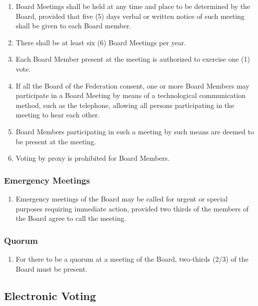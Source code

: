 \begin{enumerate}
 \item
  Board Meetings shall be held at any time and place to be determined by the Board, provided that five (5) days verbal or written notice of such meeting shall be given to each Board member.
 \item
  There shall be at least six (6) Board Meetings per year.
 \item
  Each Board Member present at the meeting is authorized to exercise one (1) vote.
 \item
  If all the Board of the Federation consent, one or more Board Members may participate in a Board Meeting by means of a technological communication method, such as the telephone, allowing all persons participating in the meeting to hear each other.
 \item
  Board Members participating in such a meeting by such means are deemed to be present at the meeting.
 \item
  Voting by proxy is prohibited for Board Members.
\end{enumerate}

\subsubsection{Emergency Meetings}
\label{emergency-meetings}

\begin{enumerate}
 \item
  Emergency meetings of the Board may be called for urgent or special purposes requiring immediate action, provided two thirds of the members of the Board agree to call the meeting.
\end{enumerate}

\subsubsection{Quorum}
\label{quorum}

\begin{enumerate}
 \item
  For there to be a quorum at a meeting of the Board, two-thirds (2/3) of the Board must be present.
\end{enumerate}

\subsection{Electronic Voting}
\label{electronic-voting}

